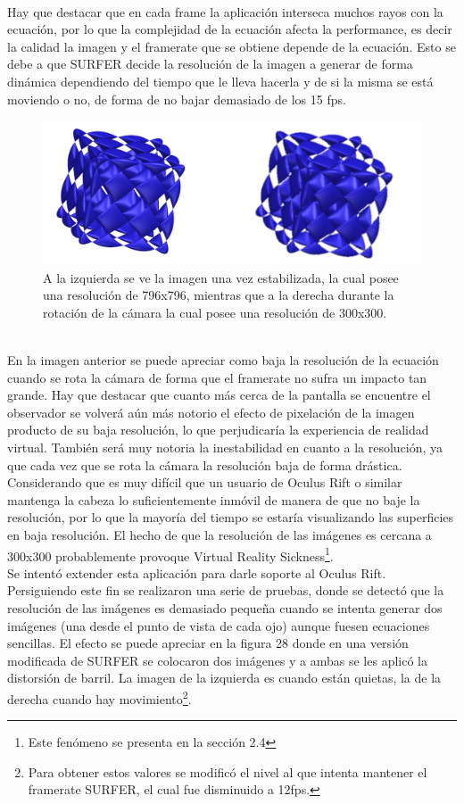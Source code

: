 \documentclass[12pt]{article}
\begin{document}
\\Hay que destacar que en cada frame la aplicación interseca muchos rayos con la ecuación, por lo que la complejidad de la ecuación afecta la performance, es decir la calidad la imagen  y el framerate que se obtiene depende de la ecuación. Esto se debe a que SURFER decide la resolución de la imagen a generar de forma dinámica dependiendo del tiempo que le lleva hacerla y de si la misma se está moviendo o no, de forma de no bajar demasiado de los 15 fps.
\begin{figure}[h]
\includegraphics[width=\textwidth]{surfer_en_movimiento.png}
\caption{A la izquierda se ve la imagen una vez estabilizada, la cual posee una resolución de 796x796, mientras que a la derecha durante la rotación de la cámara la cual posee una resolución de 300x300.}
\end{figure}
\\En la imagen anterior se puede apreciar como baja la resolución de la ecuación cuando se rota la cámara de forma  que el framerate no sufra un impacto tan grande. Hay que destacar que cuanto más cerca de la pantalla se encuentre el observador se volverá aún más notorio el efecto de pixelación de la imagen producto de su baja resolución, lo que perjudicaría la experiencia de realidad virtual. También será muy notoria la inestabilidad en cuanto a la resolución, ya que cada vez que se rota la cámara la resolución baja de forma drástica. Considerando que es muy difícil que un  usuario de Oculus Rift o similar mantenga la cabeza lo suficientemente inmóvil de manera de que no baje la resolución, por lo que la mayoría del tiempo se estaría visualizando las superficies en baja resolución. El hecho de que la resolución de las imágenes es cercana a 300x300 probablemente provoque Virtual Reality Sickness\footnote{Este fenómeno se presenta en la sección 2.4}.
\\Se intentó extender esta aplicación para darle soporte al Oculus Rift. Persiguiendo este fin se realizaron una serie de pruebas, donde se detectó que la resolución de las imágenes es demasiado pequeña cuando se intenta generar dos imágenes (una desde el punto de vista de cada ojo) aunque fuesen ecuaciones sencillas. El efecto se puede apreciar en la figura 28 donde en una versión modificada de SURFER se colocaron dos imágenes y a ambas se les aplicó la distorsión de barril. La imagen de la izquierda es cuando están quietas, la de la derecha cuando hay movimiento\footnote{Para obtener estos valores se modificó el nivel al que intenta mantener el framerate SURFER, el cual fue disminuido a 12fps.}.
\end{document}
